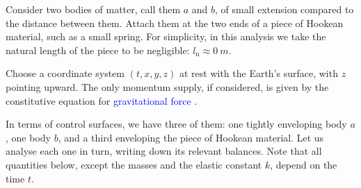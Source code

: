 \documentclass[a4paper,12pt,%
onecolumn,oneside,%
british%
]{memoir}
\renewcommand*{\|}[1][]{\nonscript\:#1\vert\nonscript\:\mathopen{}}
\newcommand*{\sect}{\S}%
\renewcommand*{\autoref}[3][\sect\,\ref]{\textcolor{blue}{#3}
\raisebox{0.6ex}{\color{blue}\miniscule%
\faIcon{angle-right}%
\;#1{#2}\;p.\,\pageref{#2}}}
\newcommand*{\ylo}{l_{\textrm{n}}}
\begin{document}
\medskip

Consider two bodies of matter, call them $a$ and $b$, of small extension compared to the distance between them. Attach them at the two ends of a piece of Hookean material, such as a small spring. For simplicity, in this analysis we take the natural length of the piece to be negligible: $\ylo \approx \qty{0}{m}$.

Choose a coordinate system $(t,x,y,z)$ at rest with the Earth's surface, with $z$ pointing upward. The only momentum supply, if considered, is given by the constitutive equation for \autoref{sec:gravity}{gravitational force}.

In terms of control surfaces, we have three of them: one tightly enveloping body $a$, one body $b$, and a third enveloping the piece of Hookean material. Let us analyse each one in turn, writing down its relevant balances. Note that all quantities below, except the masses and the elastic constant $k$, depend on the time $t$.
\end{document}
